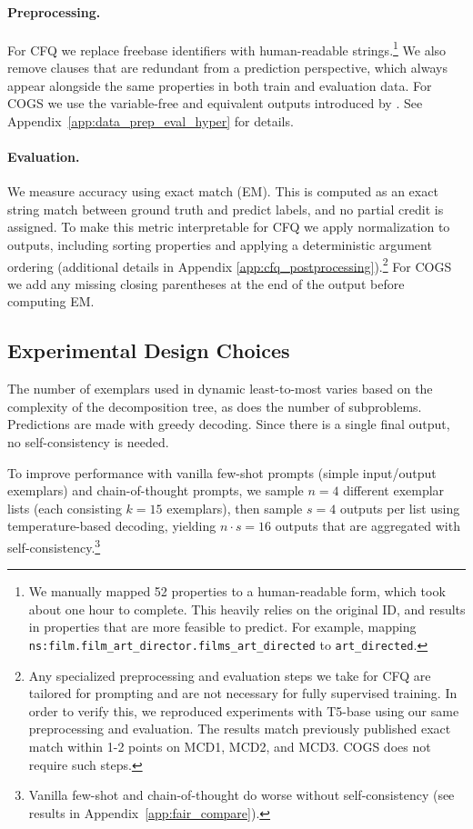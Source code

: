 \documentclass{article} \usepackage{iclr2022_conference,times}
\begin{document}
\paragraph{Preprocessing.} For CFQ we replace freebase identifiers with human-readable strings.\footnote{We manually mapped 52 properties to a human-readable form, which took about one hour to complete. This heavily relies on the original ID, and results in properties that are more feasible to predict. For example, mapping \texttt{ns:film.film\_art\_director.films\_art\_directed} to \texttt{art\_directed}.} We also remove clauses that are redundant from a prediction perspective, which always appear alongside the same properties in both train and evaluation data. For COGS we use the variable-free and equivalent outputs introduced by \cite{qiu-etal-2022-improving}. See Appendix~\ref{app:data_prep_eval_hyper} for details.

\paragraph{Evaluation.} We measure accuracy using exact match (EM). This is computed as an exact string match between ground truth and predict labels, and no partial credit is assigned. To make this metric interpretable for CFQ we apply normalization to outputs, including sorting properties and applying a deterministic argument ordering (additional details in Appendix \ref{app:cfq_postprocessing}).\footnote{Any specialized preprocessing and evaluation steps we take for CFQ are tailored for prompting and are not necessary for fully supervised training. In order to verify this, we reproduced experiments with T5-base using our same preprocessing and evaluation. The results match previously published exact match within 1-2 points on MCD1, MCD2, and MCD3. COGS does not require such steps.} For COGS we add any missing closing parentheses at the end of the output before computing EM.

\subsection{Experimental Design Choices \label{sec:modeling}}


The number of exemplars used in dynamic least-to-most varies  based on the complexity of the decomposition tree, as does the number of subproblems. Predictions are made with greedy decoding. Since there is a single final output, no self-consistency is needed.

To improve performance with vanilla few-shot prompts (simple input/output exemplars) and chain-of-thought prompts, we sample $n=4$ different exemplar lists (each consisting $k=15$ exemplars), then sample $s=4$ outputs per list using temperature-based decoding, yielding $n \cdot s = 16$ outputs that are aggregated with self-consistency.\footnote{Vanilla few-shot and chain-of-thought do worse without self-consistency (see results in Appendix~\ref{app:fair_compare}).}
\end{document}

